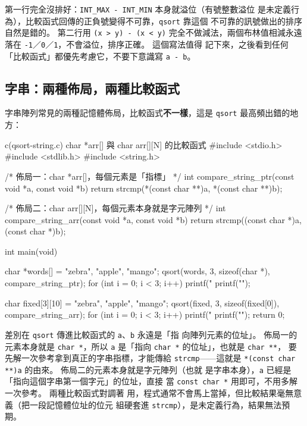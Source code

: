 
第一行完全沒排好：\texttt{INT\_MAX - INT\_MIN} 本身就溢位（有號整數溢位
是未定義行為），比較函式回傳的正負號變得不可靠，\texttt{qsort} 靠這個
不可靠的訊號做出的排序自然是錯的。 第二行用
\texttt{(x > y) - (x < y)} 完全不做減法，兩個布林值相減永遠落在
\texttt{-1}／\texttt{0}／\texttt{1}，不會溢位，排序正確。 這個寫法值得
記下來，之後看到任何「比較函式」都優先考慮它，不要下意識寫
\texttt{a - b}。

\subsection{字串：兩種佈局，兩種比較函式}

字串陣列常見的兩種記憶體佈局，比較函式\textbf{不一樣}，這是
\texttt{qsort} 最高頻出錯的地方：

\begin{example}{c}{(qsort-string.c) char *arr[] 與 char arr[][N] 的比較函式}
#include <stdio.h>
#include <stdlib.h>
#include <string.h>

/* 佈局一：char *arr[]，每個元素是「指標」 */
int compare_string_ptr(const void *a, const void *b) {
    return strcmp(*(const char **)a, *(const char **)b);
}

/* 佈局二：char arr[][N]，每個元素本身就是字元陣列 */
int compare_string_arr(const void *a, const void *b) {
    return strcmp((const char *)a, (const char *)b);
}

int main(void) {
    char *words[] = {"zebra", "apple", "mango"};
    qsort(words, 3, sizeof(char *), compare_string_ptr);
    for (int i = 0; i < 3; i++) printf("%
    printf("\n");

    char fixed[3][10] = {"zebra", "apple", "mango"};
    qsort(fixed, 3, sizeof(fixed[0]), compare_string_arr);
    for (int i = 0; i < 3; i++) printf("%
    printf("\n");
    return 0;
}
\end{example}


差別在 \texttt{qsort} 傳進比較函式的 \texttt{a}、\texttt{b} 永遠是「指
向陣列元素的位址」。 佈局一的元素本身就是 \texttt{char *}，所以
\texttt{a} 是「指向 \texttt{char *} 的位址」，也就是 \texttt{char **}，
要先解一次參考拿到真正的字串指標，才能傳給 \texttt{strcmp}——這就是
\texttt{*(const char **)a} 的由來。 佈局二的元素本身就是字元陣列（也就
是字串本身），\texttt{a} 已經是「指向這個字串第一個字元」的位址，直接
當 \texttt{const char *} 用即可，不用多解一次參考。 兩種比較函式對調著
用，程式通常不會馬上當掉，但比較結果毫無意義（把一段記憶體位址的位元
組硬套進 \texttt{strcmp}），是未定義行為，結果無法預期。

